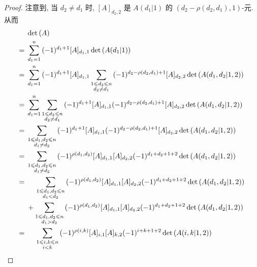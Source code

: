 \begin{proof}
    注意到, 当 \(d_2 \neq d_1\) 时,
    \([A]_{d_2,2}\) 是
    \(A(d_1|1)\) 的
    \((d_2 - \rho(d_2, d_1), 1)\)-元.
    从而
    \begin{align*}
             & \det {(A)}
        \\
        = {} &
        \sum_{d_1 = 1}^{n} {(-1)^{d_1+1} [A]_{d_1,1}
        \det {(A(d_1|1))}}
        \\
        = {} &
        \sum_{d_1 = 1}^{n} {(-1)^{d_1+1} [A]_{d_1,1}
        \sum_{\substack{1 \leq d_2 \leq n     \\d_2 \neq d_1}}
        {(-1)^{d_2 - \rho(d_2,d_1) + 1} [A]_{d_2,2}
            \det {(A(d_1,d_2|1,2))}}}
        \\
        = {} &
        \sum_{d_1 = 1}^{n}
        {\sum_{\substack{1 \leq d_2 \leq n    \\d_2 \neq d_1}}
        {(-1)^{d_1+1} [A]_{d_1,1}
            (-1)^{d_2 - \rho(d_2,d_1) + 1} [A]_{d_2,2}
            \det {(A(d_1,d_2|1,2))}}}
        \\
        = {} &
        \sum_{\substack{1 \leq d_1,d_2 \leq n \\d_1 \neq d_2}}
        {(-1)^{d_1+1} [A]_{d_1,1}
            (-1)^{d_2 - \rho(d_2,d_1) + 1} [A]_{d_2,2}
            \det {(A(d_1,d_2|1,2))}}
        \\
        = {} &
        \sum_{\substack{1 \leq d_1,d_2 \leq n \\d_1 \neq d_2}}
        {(-1)^{\rho(d_1,d_2)}
                [A]_{d_1,1} [A]_{d_2,2}
            (-1)^{d_1+d_2+1+2}
            \det {(A(d_1,d_2|1,2))}}
        \\
        = {} &
        \hphantom{{} + {}}
        \sum_{\substack{1 \leq d_1,d_2 \leq n \\d_1 < d_2}}
        {(-1)^{\rho(d_1,d_2)}
                [A]_{d_1,1} [A]_{d_2,2}
            (-1)^{d_1+d_2+1+2}
            \det {(A(d_1,d_2|1,2))}}
        \\
             &
        +
        \sum_{\substack{1 \leq d_1,d_2 \leq n \\d_1 > d_2}}
        {(-1)^{\rho(d_1,d_2)}
                [A]_{d_1,1} [A]_{d_2,2}
            (-1)^{d_1+d_2+1+2}
            \det {(A(d_1,d_2|1,2))}}
        \\
        = {} &
        \hphantom{{} + {}}
        \sum_{\substack{1 \leq i,k \leq n     \\i < k}}
        {(-1)^{\rho(i,k)}
                [A]_{i,1} [A]_{k,2}
            (-1)^{i+k+1+2}
            \det {(A(i,k|1,2))}}

\end{align*}
\end{proof}
